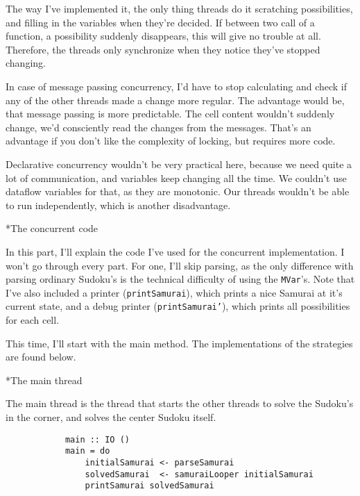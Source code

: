 \documentclass[a4paper,12pt]{article}
\begin{document}
\begin{section}
\begin{subsection}
        The way I've implemented it, the only thing threads do it scratching
        possibilities, and filling in the variables when they're decided. If
        between two call of a function, a possibility suddenly disappears, this
        will give no trouble at all. Therefore, the threads only synchronize
        when they notice they've stopped changing.

        In case of message passing concurrency, I'd have to stop calculating and
        check if any of the other threads made a change more regular. The
        advantage would be, that message passing is more predictable. The cell
        content wouldn't suddenly change, we'd consciently read the changes from
        the messages. That's an advantage if you don't like the complexity of
        locking, but requires more code.

        Declarative concurrency wouldn't be very practical here, because we need
        quite a lot of communication, and variables keep changing all the time.
        We couldn't use dataflow variables for that, as they are monotonic. Our
        threads wouldn't be able to run independently, which is another
        disadvantage.

    \end{subsection}


    \begin{subsection}*{The concurrent code}

        In this part, I'll explain the code I've used for the concurrent
        implementation. I won't go through every part. For one, I'll skip
        parsing, as the only difference with parsing ordinary Sudoku's is the
        technical difficulty of using the \texttt{MVar}'s. Note that I've also
        included a printer (\texttt{printSamurai}), which prints a nice Samurai
        at it's current state, and a debug printer (\texttt{printSamurai'}),
        which prints all possibilities for each cell.

        This time, I'll start with the main method. The implementations of the
        strategies are found below.

        \begin{subsubsection}*{The main thread}

            The main thread is the thread that starts the other threads to solve
            the Sudoku's in the corner, and solves the center Sudoku itself.

            \begin{lstlisting}
            main :: IO ()
            main = do
                initialSamurai <- parseSamurai
                solvedSamurai  <- samuraiLooper initialSamurai
                printSamurai solvedSamurai
            \end{lstlisting}


\end{subsubsection}
\end{subsection}
\end{section}
\end{document}

